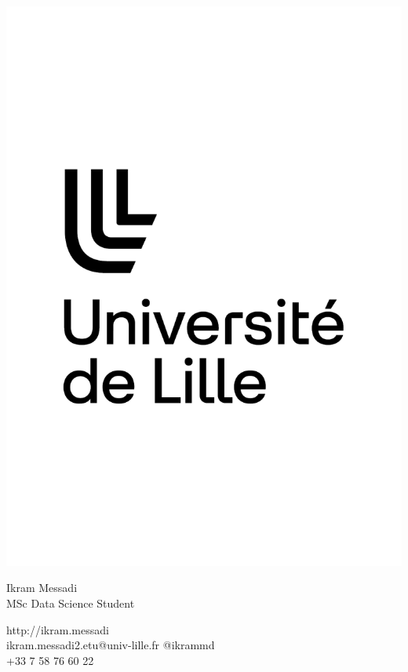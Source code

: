 \documentclass{article}
\begin{document}
\centering \includegraphics[width=.25\linewidth]{logo}\\[5pt]
\parbox{2in}{\Large \centering Ikram Messadi\\[1pt]
\normalsize MSc Data Science Student}

\vfill
\raggedright
\begin{multicols}{2}
http://ikram.messadi\\
ikram.messadi2.etu@univ-lille.fr
\columnbreak
\raggedleft
@ikrammd\\
+33 7 58 76 60 22%
\end{multicols}%
\end{document}
